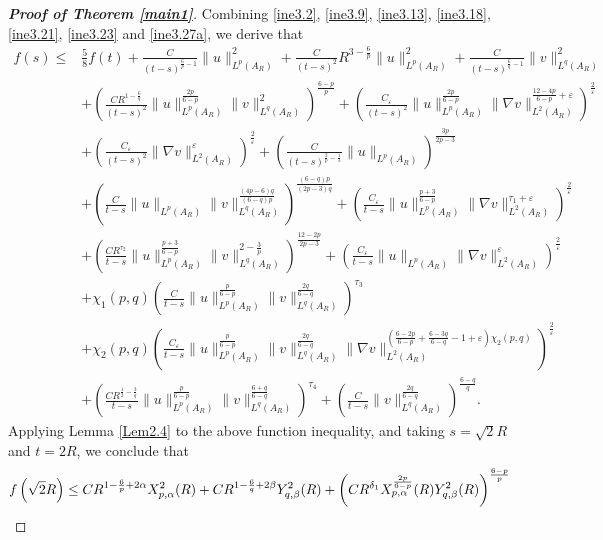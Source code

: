 \documentclass[11pt,reqno]{amsart}
\numberwithin{Thm}{section}
\begin{document}
\begin{proof}[{\bf Proof of Theorem \ref{main1}}]
Combining  \eqref{ine3.2}, \eqref{ine3.9}, \eqref{ine3.13}, \eqref{ine3.18}, \eqref{ine3.21}, \eqref{ine3.23} and \eqref{ine3.27a}, we derive that
\begin{align*}
f(s)\leq&\frac{5}{8}f(t)+\frac{C}{(t-s)^{\frac{6}{p}-1}}\|u\|_{L^p(A_{R})}^{2}+\frac{C}{(t-s)^2}R^{3-\frac{6}{p}}\|u\|_{L^{p}(A_{R})}^{2}+\frac{C}{(t-s)^{\frac{6}{q}-1}}\|v\|_{L^{q}(A_{R})}^{2}\\
&+\left(\frac{C R^{1-\frac{6}{q}}}{(t-s)^2}\|u\|_{L^p(A_R)}^\frac{2p}{6-p}\|v\|_{L^q(A_R)}^2\right)^\frac{6-p}{p}+\left(\frac{C_\varepsilon}{(t-s)^2}\|u\|_{L^p(A_R)}^\frac{2p}{6-p}\|\nabla v\|_{L^2(A_R)}^{\frac{12-4p}{6-p}+\varepsilon}\right)^\frac{2}{\varepsilon}\\
&+\left(\frac{C_\varepsilon}{(t-s)^2}\|\nabla v\|_{L^2(A_R)}^\varepsilon\right)^\frac{2}{\varepsilon}+\left(\frac{C}{(t-s)^{\frac{2}{p}-\frac{1}{3}}}\|u\|_{L^p(A_{R})}\right)^\frac{3p}{2p-3}\\
&+\left(\frac{C}{t-s}\|u\|_{L^p(A_R)}\|v\|_{L^q(A_R)}^\frac{(4p-6)q}{(6-q)p}\right)^\frac{(6-q)p}{(2p-3)q}+\left(\frac{C_\varepsilon}{t-s}\|u\|_{L^p(A_R)}^\frac{p+3}{6-p}\|\nabla v\|_{L^2(A_R)}^{\tau_1+\varepsilon}\right)^\frac{2}{\varepsilon}\\
&+\left(\frac{C R^{\tau_2}}{t-s}\|u\|_{L^p(A_R)}^\frac{p+3}{6-p}\|v\|_{L^q(A_R)}^{2-\frac{3}{p}}\right)^\frac{12-2p}{2p-3}+\left(\frac{C_\varepsilon}{t-s}\| u\|_{L^p(A_R)}\| \nabla v\|_{L^2(A_R)}^{\varepsilon}\right)^\frac{2}{\varepsilon}\\
&+\chi_1(p,q)\left(\frac{C}{t-s}\|u\|_{L^p(A_R)}^{\frac{p}{6-p}} \|v\|_{L^q(A_R)}^{\frac{2q}{6-q}}\right)^{\tau_3}\\
&+\chi_2(p,q)\left( \frac{C_\varepsilon}{t-s}\|u\|_{L^p(A_R)}^{\frac{p}{6-p}} \|v\|_{L^q(A_R)}^{\frac{2q}{6-q}} \|\nabla v\|_{L^2(A_R)}^{\left(\frac{6-2p}{6-p}+\frac{6-3q}{6-q}-1+\varepsilon\right)\chi_2(p,q)} \right)^{\frac{2}{\varepsilon}}\\
&+\left( \frac{C R^{\frac{1}{2}-\frac{3}{q}}}{t-s} \|u\|_{L^p(A_R)}^{\frac{p}{6-p}} \|v\|_{L^q(A_R)}^{\frac{6+q}{6-q}} \right)^{\tau_4}+ \left(\frac{C}{t-s} \|v\|_{L^q(A_R)}^{\frac{2q}{6-q}} \right)^{\frac{6-q}{q}}.
\end{align*}
Applying Lemma \ref{Lem2.4} to the above function inequality, and taking $s=\sqrt{2}R$ and $t=2R$, we conclude that
\begin{align}\label{ine3.44}
f\left(\sqrt{2}R\right)&\leq CR^{1-\frac{6}{p}+2\alpha}X^2_{p,\alpha}(R)+CR^{1-\frac{6}{q}+2\beta}Y^2_{q,\beta}(R)+\left(CR^{\delta_1}X^\frac{2p}{6-p}_{p,\alpha}(R)Y^2_{q,\beta}(R)\right)^\frac{6-p}{p}\notag\\

\end{align}
\end{proof}
\end{document}
